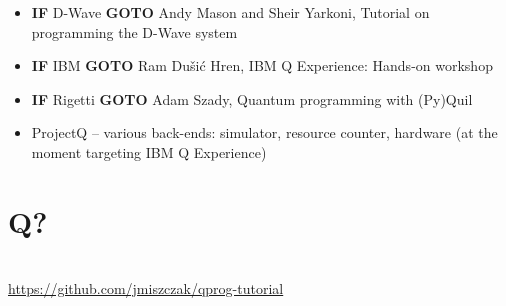 \documentclass{beamer}
\begin{document}
\begin{frame}{\insertsection}
	\begin{itemize}
		\item \textbf{IF} D-Wave \textbf{GOTO} Andy Mason and Sheir Yarkoni, 
		Tutorial on 
		programming the D-Wave system
		\item \textbf{IF} IBM \textbf{GOTO} Ram Du\v{s}i\'c Hren, IBM Q 
		Experience: Hands-on workshop
		\item \textbf{IF} Rigetti \textbf{GOTO} Adam Szady, Quantum programming 
		with (Py)Quil
		\item ProjectQ -- various back-ends: simulator, resource counter, 
		hardware (at the moment targeting IBM Q Experience)
	\end{itemize}
\end{frame}

\section{Q?}
\begin{frame}{\insertsection}
    \begin{center}
        \Huge {\color{iitis-orange} \insertsection}\\[12pt]
        \large \url{https://github.com/jmiszczak/qprog-tutorial}
    \end{center}
\end{frame}
\end{document}
